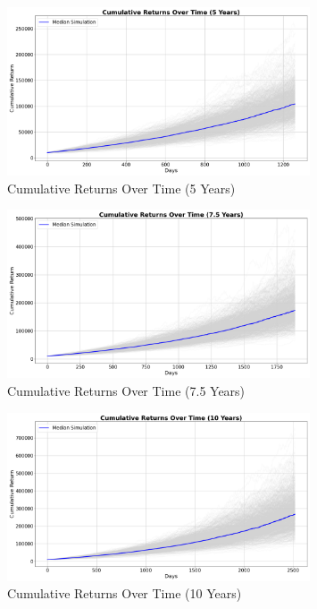 \begin{figure}[!htbp]
    \centering
    \includegraphics[width=0.8\textwidth]{../Figures/cumulative_returns_over_time_5_years.png}
    \caption{Cumulative Returns Over Time (5 Years)}
    \label{fig:cumulative_returns_5y}
\end{figure}
\FloatBarrier

\begin{figure}[!htbp]
    \centering
    \includegraphics[width=0.8\textwidth]{../Figures/cumulative_returns_over_time_7_5_years.png}
    \caption{Cumulative Returns Over Time (7.5 Years)}
    \label{fig:cumulative_returns_7_5y}
\end{figure}
\FloatBarrier

\begin{figure}[!htbp]
    \centering
    \includegraphics[width=0.8\textwidth]{../Figures/cumulative_returns_over_time_10_years.png}
    \caption{Cumulative Returns Over Time (10 Years)}
    \label{fig:cumulative_returns_10y}
\end{figure}
\FloatBarrier

